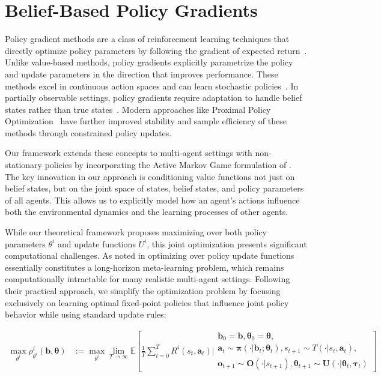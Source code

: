 \section{Belief-Based Policy Gradients}
Policy gradient methods are a class of reinforcement learning techniques that directly optimize policy parameters by following the gradient of expected return~\cite{sutton1999policy}. Unlike value-based methods, policy gradients explicitly parametrize the policy and update parameters in the direction that improves performance. These methods excel in continuous action spaces and can learn stochastic policies~\cite{williams1992simple}. In partially observable settings, policy gradients require adaptation to handle belief states rather than true states~\cite{kaelbling1998planning}. Modern approaches like Proximal Policy Optimization~\cite{schulman2017proximal} have further improved stability and sample efficiency of these methods through constrained policy updates.

Our framework extends these concepts to multi-agent settings with non-stationary policies by incorporating the Active Markov Game formulation of \citet{kim2022influencing}. The key innovation in our approach is conditioning value functions not just on belief states, but on the joint space of states, belief states, and policy parameters of all agents. This allows us to explicitly model how an agent's actions influence both the environmental dynamics and the learning processes of other agents.

While our theoretical framework proposes maximizing over both policy parameters $\theta^i$ and update functions $U^i$, this joint optimization presents significant computational challenges. As noted in \citet{kim2022influencing} optimizing over policy update functions essentially constitutes a long-horizon meta-learning problem, which remains computationally intractable for many realistic multi-agent settings. Following their practical approach, we simplify the optimization problem by focusing exclusively on learning optimal fixed-point policies that influence joint policy behavior while using standard update rules:

\begin{align}
    \max_{\theta^i} \rho^i_{\theta^i}(\boldsymbol{b}, \boldsymbol{\theta}) & := \max_{\theta^i} \lim_{T \to \infty} \mathbb{E}\left[ \frac{1}{T}\sum_{t=0}^T R^i(s_t, \boldsymbol{a}_t) \bigg|
        \begin{array}{c}
            \boldsymbol{b}_0= \boldsymbol{b}, \boldsymbol{\theta}_0= \boldsymbol{\theta}, \\
            \boldsymbol{a}_t \sim \boldsymbol{\pi}(\cdot|\boldsymbol{b}_t; \boldsymbol{\theta}_t),
            s_{t+1} \sim T(\cdot|s_t, \boldsymbol{a}_t),                                  \\
            \boldsymbol{o}_{t+1} \sim \boldsymbol{O}(\cdot|s_{t+1}),
            \boldsymbol{\theta}_{t+1} \sim \boldsymbol{U}(\cdot|\boldsymbol{\theta}_t, \boldsymbol{\tau}_t)
        \end{array}
        \right]
\end{align}

